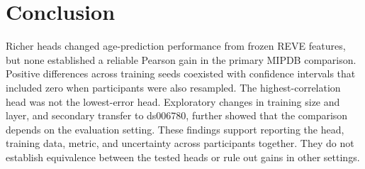 \section{Conclusion}

Richer heads changed age-prediction performance from frozen REVE features, but
none established a reliable Pearson gain in the primary MIPDB comparison.
Positive differences across training seeds coexisted with confidence intervals
that included zero when participants were also resampled. The highest-correlation
head was not the lowest-error head. Exploratory changes in training size and
layer, and secondary transfer to ds006780, further showed that the comparison
depends on the evaluation setting. These findings support reporting the head,
training data, metric, and uncertainty across participants together. They do
not establish equivalence between the tested heads or rule out gains in other
settings.
